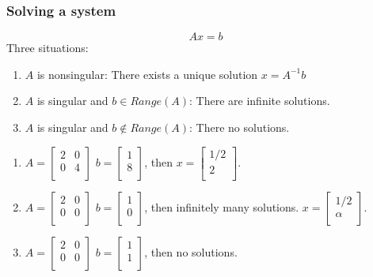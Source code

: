 \documentclass[10pt]{beamer}
\begin{document}
\begin{frame}
\frametitle{Solving a system}
\begin{equation*}
Ax=b
\end{equation*}
Three situations:
\begin{enumerate}
  \item $A$ is nonsingular: There exists a unique solution $x=A^{-1} b$

  \item $A$ is singular and $b \in Range(A)$: There are infinite solutions.

  \item $A$ is singular and $b \notin Range(A)$: There no solutions.
\end{enumerate}

\begin{enumerate}
  \item 
$A=\begin{bmatrix}2&0\\0&4\\\end{bmatrix}$
$b=\begin{bmatrix}1\\8\\\end{bmatrix}$, then
$x=\begin{bmatrix}1/2\\2\\\end{bmatrix}$.

  \item 
$A=\begin{bmatrix}2&0\\0&0\\\end{bmatrix}$
$b=\begin{bmatrix}1\\0\\\end{bmatrix}$, then infinitely many solutions.
$x=\begin{bmatrix}1/2\\\alpha\\\end{bmatrix}$.

  \item 
$A=\begin{bmatrix}2&0\\0&0\\\end{bmatrix}$
$b=\begin{bmatrix}1\\1\\\end{bmatrix}$, then no solutions.
\end{enumerate}


\end{frame}
\end{document}
